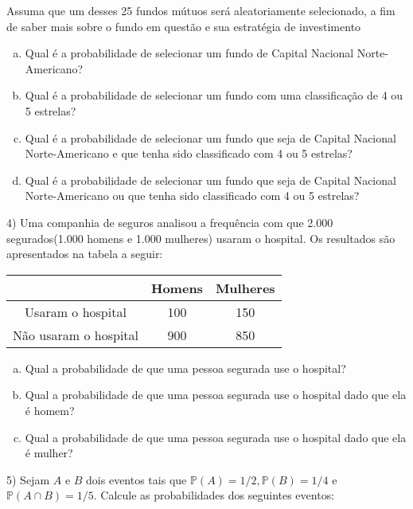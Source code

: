 \documentclass{article}
\begin{document}
Assuma que um desses 25 fundos mútuos será aleatoriamente selecionado, a fim de saber mais sobre o fundo em questão e sua estratégia de investimento 

\begin{enumerate}[a)] %
    \item Qual é a probabilidade de selecionar um fundo de Capital Nacional Norte-Americano?
    \item Qual é a probabilidade de selecionar um fundo com uma classificação de 4 ou 5 estrelas?
    \item Qual é a probabilidade de selecionar um fundo que seja de Capital Nacional Norte-Americano e que tenha sido classificado com 4 ou 5 estrelas?
    \item Qual é a probabilidade de selecionar um fundo que seja de Capital Nacional Norte-Americano ou que tenha sido classificado com 4 ou 5 estrelas?
\end{enumerate}

\vspace{5px}

4) Uma companhia de seguros analisou a frequência com que 2.000 segurados(1.000 homens e 1.000 mulheres) usaram o hospital. Os resultados são apresentados na tabela a seguir:

\begin{table}[H]
\centering
\begin{tabular}{ccc}
\hline
                      & Homens & Mulheres \\ \hline
Usaram o hospital     & 100    & 150      \\
Não usaram o hospital & 900    & 850      \\ \hline
\end{tabular}
\end{table}

\begin{enumerate}[a)] %
    \item Qual a probabilidade de que uma pessoa segurada use o hospital?
    \item Qual a probabilidade de que uma pessoa segurada use o hospital dado que ela é homem? 
    \item Qual a probabilidade de que uma pessoa segurada use o hospital dado que ela é mulher? 
\end{enumerate}

\vspace{5px}

5) Sejam $A$ e $B$ dois eventos tais que $\mathds{P}(A) = 1/2, \mathds{P}(B)=1/4$ e $\mathds{P}(A\cap B) = 1/5$. Calcule as probabilidades dos seguintes eventos:
\end{document}
